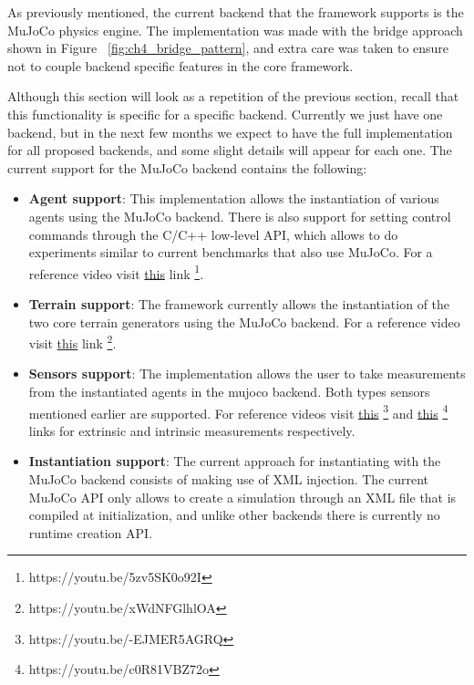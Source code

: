 As previously mentioned, the current backend that the framework supports is the
MuJoCo physics engine. The implementation was made with the bridge approach shown
in Figure ~\ref{fig:ch4_bridge_pattern}, and extra care was taken to ensure not
to couple backend specific features in the core framework. 

Although this section will look as a repetition of the previous section, recall
that this functionality is specific for a specific backend. Currently we just have
one backend, but in the next few months we expect to have the full implementation
for all proposed backends, and some slight details will appear for each one. The 
current support for the MuJoCo backend contains the following:

\begin{itemize}
    \item \textbf{Agent support}: This implementation allows the instantiation of 
          various agents using the MuJoCo backend. There is also support for setting 
          control commands through the C/C++ low-level API, which allows to do 
          experiments similar to current benchmarks that also use MuJoCo. For a reference 
          video visit \href{https://youtu.be/5zv5SK0o92I}{this} link \footnote{https://youtu.be/5zv5SK0o92I}.

    \item \textbf{Terrain support}: The framework currently allows the instantiation 
          of the two core terrain generators using the MuJoCo backend. For a reference 
          video visit \href{https://youtu.be/xWdNFGlhlOA}{this} link \footnote{https://youtu.be/xWdNFGlhlOA}.

    \item \textbf{Sensors support}: The implementation allows the user to take 
          measurements from the instantiated agents in the mujoco backend. Both
          types sensors mentioned earlier are supported. For reference 
          videos visit \href{https://youtu.be/-EJMER5AGRQ}{this} \footnote{https://youtu.be/-EJMER5AGRQ} and 
          \href{https://youtu.be/c0R81VBZ72o}{this} \footnote{https://youtu.be/c0R81VBZ72o} 
          links for extrinsic and intrinsic measurements respectively.

    \item \textbf{Instantiation support}: The current approach for instantiating
          with the MuJoCo backend consists of making use of XML injection. The
          current MuJoCo API only allows to create a simulation through an XML
          file that is compiled at initialization, and unlike other backends there
          is currently no runtime creation API. 


\end{itemize}
